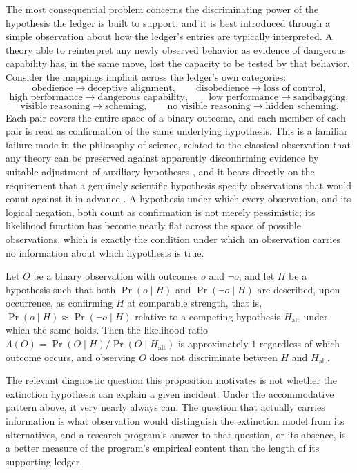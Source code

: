 The most consequential problem concerns the discriminating power of the hypothesis the ledger is built to support, and it is best introduced through a simple observation about how the ledger's entries are typically interpreted. A theory able to reinterpret any newly observed behavior as evidence of dangerous capability has, in the same move, lost the capacity to be tested by that behavior. Consider the mappings implicit across the ledger's own categories:
\[
\text{obedience} \to \text{deceptive alignment}, \qquad \text{disobedience} \to \text{loss of control},
\]
\[
\text{high performance} \to \text{dangerous capability}, \qquad \text{low performance} \to \text{sandbagging},
\]
\[
\text{visible reasoning} \to \text{scheming}, \qquad \text{no visible reasoning} \to \text{hidden scheming}.
\]
Each pair covers the entire space of a binary outcome, and each member of each pair is read as confirmation of the same underlying hypothesis. This is a familiar failure mode in the philosophy of science, related to the classical observation that any theory can be preserved against apparently disconfirming evidence by suitable adjustment of auxiliary hypotheses \cite{quine1951}, and it bears directly on the requirement that a genuinely scientific hypothesis specify observations that would count against it in advance \cite{popper1959}. A hypothesis under which every observation, and its logical negation, both count as confirmation is not merely pessimistic; its likelihood function has become nearly flat across the space of possible observations, which is exactly the condition under which an observation carries no information about which hypothesis is true.

\begin{proposition}
\label{prop:flat-likelihood}
Let $O$ be a binary observation with outcomes $o$ and $\neg o$, and let $H$ be a hypothesis such that both $\Pr(o \mid H)$ and $\Pr(\neg o \mid H)$ are described, upon occurrence, as confirming $H$ at comparable strength, that is, $\Pr(o \mid H) \approx \Pr(\neg o \mid H)$ relative to a competing hypothesis $H_{\mathrm{alt}}$ under which the same holds. Then the likelihood ratio $\Lambda(O) = \Pr(O \mid H)/\Pr(O \mid H_{\mathrm{alt}})$ is approximately $1$ regardless of which outcome occurs, and observing $O$ does not discriminate between $H$ and $H_{\mathrm{alt}}$.
\end{proposition}

The relevant diagnostic question this proposition motivates is not whether the extinction hypothesis can explain a given incident. Under the accommodative pattern above, it very nearly always can. The question that actually carries information is what observation would distinguish the extinction model from its alternatives, and a research program's answer to that question, or its absence, is a better measure of the program's empirical content than the length of its supporting ledger.

